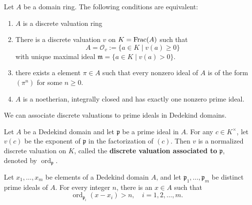 \documentclass[12pt, oneside]{book}
\begin{document}
\begin{theorem}
    \label{thm:discrete valuation ring}
    Let $A$ be a domain ring. The following conditions are equivalent:
    \begin{enumerate}
        \item
              $A$ is a discrete valuation ring
        \item
              There is a discrete valuation $v$ on $K=\operatorname{Frac}(A)$ such that
              \begin{equation*}
                  A
                  =
                  \mathcal{O}_v
                  :=
                  \{a \in K \mid v(a) \geq 0\}
              \end{equation*}
              with unique maximal ideal $\mathfrak{m} = \{a \in K \mid v(a) > 0\}$.
        \item
              there exists a element $\pi \in A$ such that every nonzero ideal of $A$ is of the form $\left(\pi^n\right)$ for some $n \geq 0$.
        \item
              $A$ is a noetherian, integrally closed and has exactly one nonzero prime ideal.
    \end{enumerate}
\end{theorem}
We can associate discrete valuations to prime ideals in Dedekind domains.
\begin{definition}
    Let $A$ be a Dedekind domain and let $\mathfrak{p}$ be a prime ideal in $A$. For any $c \in K^{\times}$, let $v(c)$ be the exponent of $\mathfrak{p}$ in the factorization of
    $(c)$.
    Then $v$ is a normalized discrete valuation on $K$, called the \textbf{discrete valuation associated to} $\mathfrak{p}$, denoted by $\operatorname{ord}_{\mathfrak{p}}$.
\end{definition}

\begin{proposition}
    Let $x_1, \ldots, x_m$ be elements of a Dedekind domain $A$, and let $\mathfrak{p}_1, \ldots, \mathfrak{p}_m$ be distinct prime ideals of $A$. For every integer $n$, there is an $x \in A$ such that
    \begin{equation*}
        \operatorname{ord}_{\mathfrak{p}_i}\left(x-x_i\right)>n, \quad i=1,2, \ldots, m .
    \end{equation*}
\end{proposition}
\end{document}
